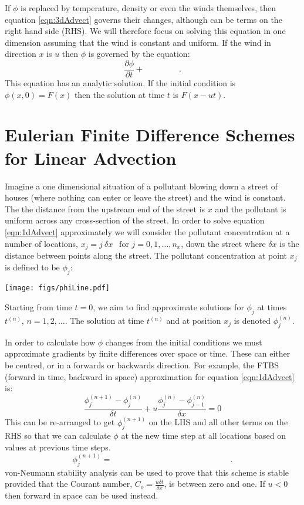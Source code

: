 If $\phi$ is replaced by temperature, density or even the winds themselves,
then equation \ref{eqn:3dAdvect} governs their changes, although can be terms on the right hand side (RHS). We will therefore focus on solving this equation in one dimension assuming that the wind is constant and uniform. If the wind in direction $x$ is $u$ then $\phi$ is governed by the equation:
\begin{equation}
\frac{\partial\phi}{\partial t} + ~~~~~~~~~~~~~~~~~~~.
\label{eqn:1dAdvect}
\end{equation}
This equation has an analytic solution. If the initial condition is $\phi(x,0)=F(x)$ then the solution at time $t$ is $F(x-ut)$. 

\section{Eulerian Finite Difference Schemes for Linear Advection}

Imagine a one dimensional situation of a pollutant blowing down a street of houses (where nothing can enter or leave the street) and the wind is constant. The the distance from the upstream end of the street is $x$ and the pollutant is uniform across any cross-section of the street. In order to solve equation \ref{eqn:1dAdvect} approximately we will consider the pollutant concentration at a number of locations, $x_j = j~\delta x ~~\text{ for } j = 0,1,\ldots, n_x$, down the street where $\delta x$ is the distance between points along the street. The pollutant concentration at point $x_j$ is defined to be $\phi_j$:\\
\begin{center}
\texttt{[image: figs/phiLine.pdf]}
\end{center}
Starting from time $t=0$, we aim to find approximate solutions for $\phi_j$ at times $t^{(n)}$, $n=1,2,\ldots$. The solution at time $t^{(n)}$ and at position $x_j$ is denoted $\phi^{(n)}_j$.

In order to calculate how $\phi$ changes from the initial conditions we must approximate gradients by finite differences over space or time. These can either be centred, or in a forwards or backwards direction. For example, the FTBS (forward in time, backward in space) approximation for equation \ref{eqn:1dAdvect} is:
\begin{equation}
\frac{\phi^{(n+1)}_j - \phi^{(n)}_j}{\delta t}  +u\frac{\phi^{(n)}_j - \phi^{(n)}_{j-1}}{\delta x} = 0
\end{equation}
This can be re-arranged to get $\phi^{(n+1)}_j$ on the LHS and all other terms on the RHS so that we can calculate $\phi$ at the new time step at all locations based on values at previous time steps.
\begin{equation}
\phi^{(n+1)}_j = ~~~~~~~~~~~~~~~~~~~~~~~~~~~~~~~~~~~~~~~~~~~~~~~~~~~~~~~~~~~~~~~~~.
\end{equation}
von-Neumann stability analysis can be used to prove that this scheme is stable provided that the Courant number, $C_o=\frac{u\delta t}{\delta x}$, is between zero and one. If $u<0$ then forward in space can be used instead. 

